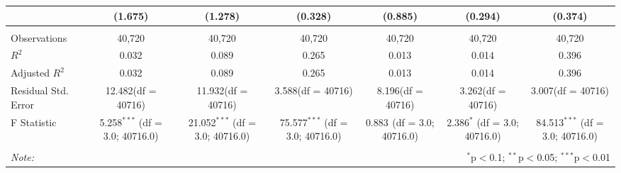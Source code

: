 \documentclass[12pt]{article}
\begin{document}
\begin{table}[!htbp]
\begin{tabular}{@{\extracolsep{5pt}}lcccccc}
  & (1.675) & (1.278) & (0.328) & (0.885) & (0.294) & (0.374) \\
\hline \\[-1.8ex]
 Observations & 40,720 & 40,720 & 40,720 & 40,720 & 40,720 & 40,720 \\
 $R^2$ & 0.032 & 0.089 & 0.265 & 0.013 & 0.014 & 0.396 \\
 Adjusted $R^2$ & 0.032 & 0.089 & 0.265 & 0.013 & 0.014 & 0.396 \\
 Residual Std. Error & 12.482(df = 40716) & 11.932(df = 40716) & 3.588(df = 40716) & 8.196(df = 40716) & 3.262(df = 40716) & 3.007(df = 40716)  \\
 F Statistic & 5.258$^{***}$ (df = 3.0; 40716.0) & 21.052$^{***}$ (df = 3.0; 40716.0) & 75.577$^{***}$ (df = 3.0; 40716.0) & 0.883$^{}$ (df = 3.0; 40716.0) & 2.386$^{*}$ (df = 3.0; 40716.0) & 84.513$^{***}$ (df = 3.0; 40716.0) \\
\hline
\hline \\[-1.8ex]
\textit{Note:} & \multicolumn{6}{r}{$^{*}$p$<$0.1; $^{**}$p$<$0.05; $^{***}$p$<$0.01} \\
\end{tabular}
\end{table}
\end{document}
